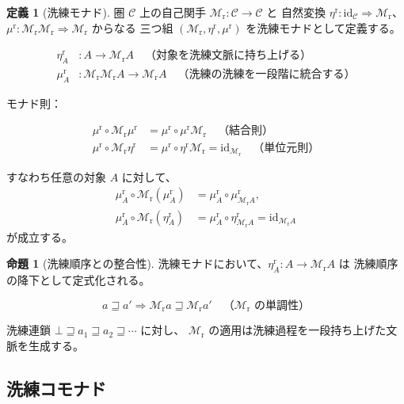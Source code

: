 \documentclass[11pt,a4paper]{article}
\theoremstyle{definition}
\newtheorem{definition}{定義}[section]
\newtheorem{proposition}{命題}[section]
\newcommand{\Mr}{\mathcal{M}_{\mathrm{r}}}
\newcommand{\etar}{\eta^{\mathrm{r}}}
\newcommand{\mur}{\mu^{\mathrm{r}}}
\newcommand{\id}{\mathrm{id}}
\begin{document}
\begin{definition}[洗練モナド]
圏 $\mathcal{C}$ 上の自己関手 $\Mr: \mathcal{C} \to \mathcal{C}$ と
自然変換 $\etar: \id_{\mathcal{C}} \Rightarrow \Mr$、
$\mur: \Mr\Mr \Rightarrow \Mr$ からなる
三つ組 $(\Mr, \etar, \mur)$ を洗練モナドとして定義する。

\begin{align}
\etar_A &: A \to \Mr A \quad \text{（対象を洗練文脈に持ち上げる）}\\
\mur_A &: \Mr\Mr A \to \Mr A \quad \text{（洗練の洗練を一段階に統合する）}
\end{align}

モナド則：

\begin{align}
\mur \circ \Mr\mur &= \mur \circ \mur\Mr
  \quad \text{（結合則）}\\
\mur \circ \Mr\etar &= \mur \circ \etar\Mr = \id_{\Mr}
  \quad \text{（単位元則）}
\end{align}

すなわち任意の対象 $A$ に対して、
\begin{align}
\mur_A \circ \Mr(\mur_A)
  &= \mur_A \circ \mur_{\Mr A},\\
\mur_A \circ \Mr(\etar_A)
  &= \mur_A \circ \etar_{\Mr A}
  = \id_{\Mr A}
\end{align}
が成立する。
\end{definition}

\begin{proposition}[洗練順序との整合性]
洗練モナドにおいて、$\etar_A: A \to \Mr A$ は
洗練順序の降下として定式化される。

\begin{equation}
a \sqsupseteq a' \Rightarrow \Mr a \sqsupseteq \Mr a'
\quad \text{（$\Mr$ の単調性）}
\end{equation}

洗練連鎖 $\bot \sqsupseteq a_1 \sqsupseteq a_2 \sqsupseteq \cdots$ に対し、
$\Mr$ の適用は洗練過程を一段持ち上げた文脈を生成する。
\end{proposition}

\subsection{洗練コモナド}
\end{document}
